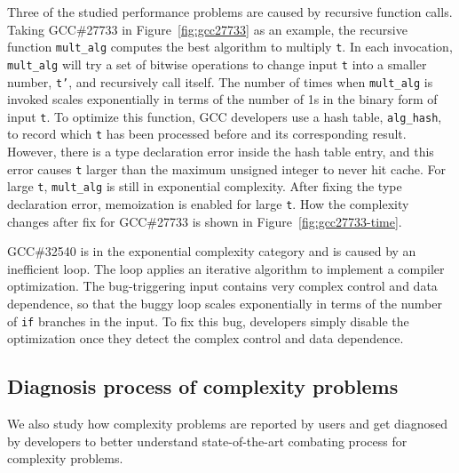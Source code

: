 Three of the studied performance problems are caused by recursive function calls. 
Taking GCC\#27733 in Figure~\ref{fig:gcc27733} as an example, 
the recursive function \texttt{mult\_alg} computes the best algorithm to multiply \texttt{t}.
In each invocation, \texttt{mult\_alg} will try a set of bitwise 
operations to change input 
\texttt{t} into a smaller number, \texttt{t'}, 
and recursively call itself.
The number of times when \texttt{mult\_alg} is invoked scales exponentially 
in terms of the number of 1s in the binary form of input \texttt{t}.
To optimize this function, 
GCC developers use a hash table, \texttt{alg\_hash}, to record
which \texttt{t} has been processed before and its corresponding result.
However, there is a type declaration error inside the hash table entry,
and this error causes \texttt{t} larger than the maximum unsigned integer to never hit cache.
For large \texttt{t}, \texttt{mult\_alg} is still in exponential complexity. 
After fixing the type declaration error, 
memoization is enabled for large \texttt{t}. 
How the complexity changes after fix for GCC\#27733 is shown in Figure~\ref{fig:gcc27733-time}.

GCC\#32540 is in the exponential complexity category and is caused by an inefficient loop. 
The loop applies an iterative algorithm to implement a compiler optimization. 
The bug-triggering input contains very complex control and data dependence,  
so that the buggy loop scales exponentially in terms of the number 
of \texttt{if} branches in the input. 
To fix this bug, developers simply disable the optimization 
once they detect the complex control and data dependence.  


\subsection{Diagnosis process of complexity problems}
\label{sec:process}

We also study how complexity problems are reported by users 
and get diagnosed by developers 
to better understand state-of-the-art combating process for complexity problems. 

